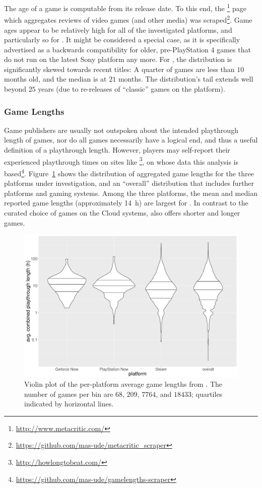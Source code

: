 The age of a game is computable from its release date. To this end, the \metacritic\footnote{\url{http://www.metacritic.com/}} page which aggregates reviews of video games (and other media) was scraped\footnote{\url{https://github.com/mas-ude/metacritic_scraper}}. Game ages appear to be relatively high for all of the investigated platforms, and particularly so for \psnow. It might be considered a special case, as it is specifically advertised as a backwards compatibility for older, pre-PlayStation 4 games that do not run on the latest Sony platform any more. For \steam, the distribution is significantly skewed towards recent titles: A quarter of games are less than $10$ months old, and the median is at $21$ months. The distribution's tail extends well beyond $25$ years (due to re-releases of ``classic'' games on the platform).


\subsubsection{Game Lengths}

Game publishers are usually not outspoken about the intended playthrough length of games, nor do all games necessarily have a logical end, and thus a useful definition of a playthrough length. However, players may self-report their experienced playthrough times on sites like \hltb\footnote{\url{http://howlongtobeat.com/}}, on whose data this analysis is based\footnote{\url{https://github.com/mas-ude/gamelengths-scraper}}.
Figure~\ref{fig:gamelengths-violin} shows the distribution of aggregated game lengths for the three platforms under investigation, and an ``overall'' distribution that includes further platforms and gaming systems. Among the three platforms, the mean and median reported game lengths (approximately \SI{14}{\hour}) are largest for \gfnow. In contrast to the curated choice of games on the Cloud systems, \steam also offers shorter and longer games.


\begin{figure}[!t]
	\centering
	\includegraphics[width=1.0\columnwidth]{images/gamelengths-by-platform-violin.pdf}
	\caption{Violin plot of the per-platform average game lengths from \hltb. The number of games per bin are $68$, $209$, $7764$, and $18433$; quartiles indicated by horizontal lines.}
\label{fig:gamelengths-violin}
\end{figure}



